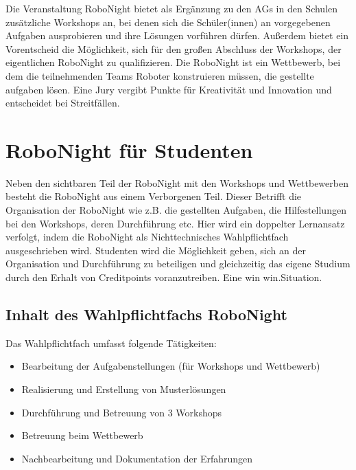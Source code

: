   \par
  Die Veranstaltung RoboNight bietet als Ergänzung zu den AGs in den Schulen zusätzliche Workshops an, bei denen sich die Schüler(innen) an vorgegebenen Aufgaben ausprobieren und ihre Lösungen vorführen dürfen. Außerdem bietet ein Vorentscheid die Möglichkeit, sich für den großen Abschluss der Workshops, der eigentlichen RoboNight zu qualifizieren. Die RoboNight ist ein Wettbewerb, bei dem die teilnehmenden Teams Roboter konstruieren müssen, die gestellte aufgaben lösen. Eine Jury vergibt Punkte für Kreativität und Innovation und entscheidet bei Streitfällen.
  

\section{RoboNight für Studenten}
  Neben den sichtbaren Teil der RoboNight mit den Workshops und Wettbewerben besteht die RoboNight aus einem Verborgenen Teil. Dieser Betrifft die Organisation der RoboNight wie z.B. die gestellten Aufgaben, die Hilfestellungen bei den Workshops, deren Durchführung etc. Hier wird ein doppelter Lernansatz verfolgt, indem die RoboNight als Nichttechnisches Wahlpflichtfach ausgeschrieben wird. Studenten wird die Möglichkeit geben, sich an der Organisation und Durchführung zu beteiligen und gleichzeitig das eigene Studium durch den Erhalt von Creditpoints voranzutreiben. Eine win win.Situation.
  
  \subsection{Inhalt des Wahlpflichtfachs RoboNight}
    Das Wahlpflichtfach umfasst folgende Tätigkeiten:
 
    \begin{itemize}\itemsep0pt
      \item Bearbeitung der Aufgabenstellungen (für Workshops und Wettbewerb)
      \item Realisierung und Erstellung von Musterlösungen
      \item Durchführung und Betreuung von 3 Workshops
      \item Betreuung beim Wettbewerb
      \item Nachbearbeitung und Dokumentation der Erfahrungen
    \end{itemize}

